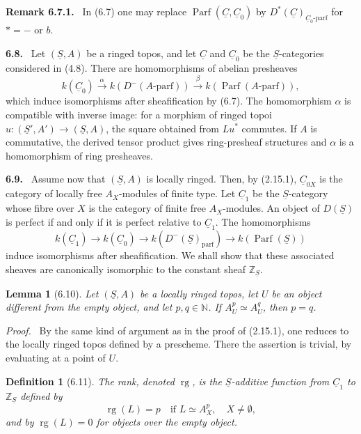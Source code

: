 \documentclass[13pt]{extarticle}
\newcommand{\ZZ}{\mathbb Z}
\newcommand{\NN}{\mathbb N}
\newcommand{\uS}{\underline S}
\newcommand{\uC}{\underline C}
\newcommand{\rg}{\operatorname{rg}}
\newcommand{\Parf}{\operatorname{Parf}}
\newenvironment{statement}[1]{\par\medskip\noindent\textbf{#1.}\ }{\par\medskip}
\newenvironment{prooftext}[1][Proof]{\par\noindent\emph{#1.}\ }{\par\medskip}
\newenvironment{remarktext}[1][Remark]{\par\noindent\textbf{#1.}\ }{\par\medskip}
\newtheorem*{lemma*}{Lemma}
\newtheorem*{definition*}{Definition}
\begin{document}
\begin{remarktext}[Remark 6.7.1]
In (6.7) one may replace $\Parf(\uC,\uC_0)$ by $D^*(\uC)_{\uC_0\text{-parf}}$ for $*=-$ or $b$.
\end{remarktext}

\begin{statement}{6.8}
Let $(\uS,A)$ be a ringed topos, and let $\uC$ and $\uC_0$ be the $\uS$-categories considered in (4.8). There are homomorphisms of abelian presheaves
\[
k(\uC_0)\xrightarrow{\alpha}k(D^-(A\text{-parf}))
\xrightarrow{\beta}k(\Parf(A\text{-parf})),
\]
which induce isomorphisms after sheafification by (6.7). The homomorphism $\alpha$ is compatible with inverse image: for a morphism of ringed topoi $u:(\uS',A')\to(\uS,A)$, the square obtained from $Lu^*$ commutes. If $A$ is commutative, the derived tensor product gives ring-presheaf structures and $\alpha$ is a homomorphism of ring presheaves.
\end{statement}

\begin{statement}{6.9}
Assume now that $(\uS,A)$ is locally ringed. Then, by (2.15.1), $\uC_{0X}$ is the category of locally free $A_X$-modules of finite type. Let $\uC_1$ be the $\uS$-category whose fibre over $X$ is the category of finite free $A_X$-modules. An object of $D(\uS)$ is perfect if and only if it is perfect relative to $\uC_1$. The homomorphisms
\[
k(\uC_1)\longrightarrow k(\uC_0)\longrightarrow
k(D^-(\uS)_{\mathrm{parf}})\longrightarrow k(\Parf(\uS))
\]
induce isomorphisms after sheafification. We shall show that these associated sheaves are canonically isomorphic to the constant sheaf $\ZZ_{\uS}$.
\end{statement}

\begin{lemma*}[6.10]
Let $(\uS,A)$ be a locally ringed topos, let $U$ be an object different from the empty object, and let $p,q\in\NN$. If $A_U^p\simeq A_U^q$, then $p=q$.
\end{lemma*}

\begin{prooftext}
By the same kind of argument as in the proof of (2.15.1), one reduces to the locally ringed topos defined by a prescheme. There the assertion is trivial, by evaluating at a point of $U$.
\end{prooftext}

\begin{definition*}[6.11]
The \emph{rank}, denoted $\rg$, is the $\uS$-additive function from $\uC_1$ to $\ZZ_{\uS}$ defined by
\[
\rg(L)=p\quad\text{if }L\simeq A_X^p,
\quad X\ne\emptyset,
\]
and by $\rg(L)=0$ for objects over the empty object.
\end{definition*}
\end{document}

